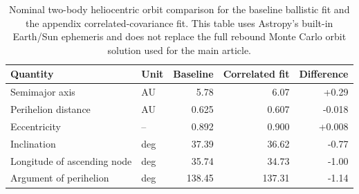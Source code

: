 \begin{table}
  \centering
  \caption{Nominal two-body heliocentric orbit comparison for the baseline ballistic fit and the appendix correlated-covariance fit.  This table uses Astropy's built-in Earth/Sun ephemeris and does not replace the full rebound Monte Carlo orbit solution used for the main article.}
  \label{tab:appendix-correlated-orbit-change}
  \begin{tabular}{llrrr}
    \toprule
    Quantity & Unit & Baseline & Correlated fit & Difference \\
    \midrule
    Semimajor axis & AU & 5.78 & 6.07 & +0.29 \\
    Perihelion distance & AU & 0.625 & 0.607 & -0.018 \\
    Eccentricity & -- & 0.892 & 0.900 & +0.008 \\
    Inclination & deg & 37.39 & 36.62 & -0.77 \\
    Longitude of ascending node & deg & 35.74 & 34.73 & -1.00 \\
    Argument of perihelion & deg & 138.45 & 137.31 & -1.14 \\
    \bottomrule
  \end{tabular}
\end{table}
